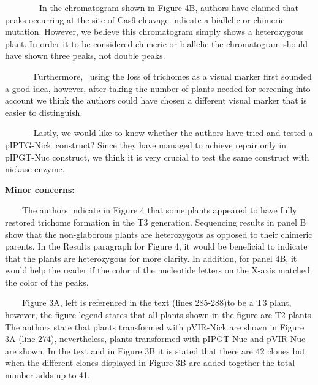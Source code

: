 \documentclass[10pt]{article}
\begin{document}
~~~~~~~~In the chromatogram shown in Figure 4B, authors have claimed
that peaks occurring at the site of Cas9 cleavage indicate a biallelic
or chimeric mutation. However, we believe this chromatogram simply shows
a heterozygous plant. In order it to be considered chimeric or biallelic
the chromatogram should have shown three peaks, not double peaks.~

~ ~ ~ ~ Furthermore,~ using the loss of trichomes as a visual marker
first sounded a good idea, however, after taking the number of plants
needed for screening into account we think the authors could have chosen
a different visual marker that is easier to distinguish.

~ ~ ~ ~ Lastly, we would like to know whether the authors have tried and
tested a pIPTG-Nick~construct? Since they have managed to achieve repair
only in pIPGT-Nuc construct, we think it is very crucial to test the
same construct with nickase enzyme.~

\textbf{Minor concerns:}

~~~~The authors indicate in Figure 4 that some plants appeared to have
fully restored trichome formation in the T3 generation. Sequencing
results in panel B show that the non-glaborous plants are heterozygous
as opposed to their chimeric parents. In the Results paragraph for
Figure 4, it would be beneficial to indicate that the plants are
heterozygous for more clarity. In addition, for panel 4B, it would help
the reader if the color of the nucleotide letters on the X-axis matched
the color of the peaks.~

~~~~Figure 3A, left is referenced in the text (lines 285-288)to be a T3
plant, however, the figure legend states that all plants shown in the
figure are T2 plants. The authors state that plants transformed with
pVIR-Nick are shown in Figure 3A (line 274), nevertheless, plants
transformed with pIPGT-Nuc and pVIR-Nuc are shown. In the text and in
Figure 3B it is stated that there are 42 clones but when the different
clones displayed in Figure 3B are added together the total number adds
up to 41.

\par\null\par\null

\FloatBarrier
\end{document}
